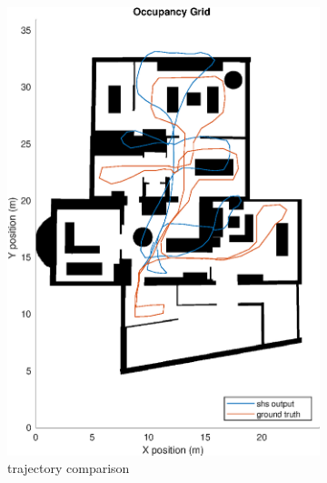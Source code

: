 \begin{figure}[]
	\centering
	\begin{subfigure}[t]{.45\textwidth}
		\centering
		\includegraphics[width=0.9\linewidth]{images/20201029_1042_trial2_shs_1}
		\caption{trajectory comparison}
		\label{fig:trial2_on_map}
	\end{subfigure}
	\begin{subfigure}[t]{.45\textwidth}
		\centering

\end{subfigure}
\end{figure}
